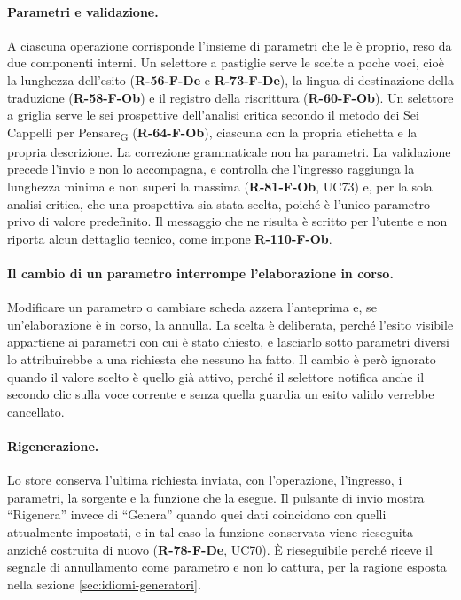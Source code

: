 \documentclass[a4paper, 10pt]{article}
\begin{document}
\paragraph{Parametri e validazione.}
A ciascuna operazione corrisponde l'insieme di parametri che le è proprio, reso da due componenti interni. Un selettore a pastiglie serve le scelte a poche voci, cioè la lunghezza dell'esito (\textbf{R-56-F-De} e \textbf{R-73-F-De}), la lingua di destinazione della traduzione (\textbf{R-58-F-Ob}) e il registro della riscrittura (\textbf{R-60-F-Ob}). Un selettore a griglia serve le sei prospettive dell'analisi critica secondo il metodo dei Sei Cappelli per Pensare\textsubscript{G} (\textbf{R-64-F-Ob}), ciascuna con la propria etichetta e la propria descrizione. La correzione grammaticale non ha parametri. La validazione precede l'invio e non lo accompagna, e controlla che l'ingresso raggiunga la lunghezza minima e non superi la massima (\textbf{R-81-F-Ob}, UC73) e, per la sola analisi critica, che una prospettiva sia stata scelta, poiché è l'unico parametro privo di valore predefinito. Il messaggio che ne risulta è scritto per l'utente e non riporta alcun dettaglio tecnico, come impone \textbf{R-110-F-Ob}.

\paragraph{Il cambio di un parametro interrompe l'elaborazione in corso.}
Modificare un parametro o cambiare scheda azzera l'anteprima e, se un'elaborazione è in corso, la annulla. La scelta è deliberata, perché l'esito visibile appartiene ai parametri con cui è stato chiesto, e lasciarlo sotto parametri diversi lo attribuirebbe a una richiesta che nessuno ha fatto. Il cambio è però ignorato quando il valore scelto è quello già attivo, perché il selettore notifica anche il secondo clic sulla voce corrente e senza quella guardia un esito valido verrebbe cancellato.

\paragraph{Rigenerazione.}
Lo store conserva l'ultima richiesta inviata, con l'operazione, l'ingresso, i parametri, la sorgente e la funzione che la esegue. Il pulsante di invio mostra ``Rigenera'' invece di ``Genera'' quando quei dati coincidono con quelli attualmente impostati, e in tal caso la funzione conservata viene rieseguita anziché costruita di nuovo (\textbf{R-78-F-De}, UC70). È rieseguibile perché riceve il segnale di annullamento come parametro e non lo cattura, per la ragione esposta nella sezione \ref{sec:idiomi-generatori}.
\end{document}
